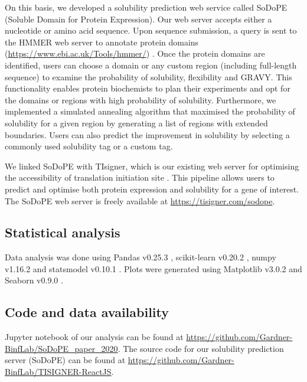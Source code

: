 On this basis, we developed a solubility prediction web service called SoDoPE (Soluble Domain for Protein Expression). Our web server accepts either a nucleotide or amino acid sequence. Upon sequence submission, a query is sent to the HMMER web server to annotate protein domains (\href{https://www.ebi.ac.uk/Tools/hmmer/}{https://www.ebi.ac.uk/Tools/hmmer/}) \citep{Potter2018-ox}. Once the protein domains are identified, users can choose a domain or any custom region (including full-length sequence) to examine the probability of solubility, flexibility and GRAVY. This functionality enables protein biochemists to plan their experiments and opt for the domains or regions with high probability of solubility. Furthermore, we implemented a simulated annealing algorithm that maximised the probability of solubility for a given region by generating a list of regions with extended boundaries. Users can also predict the improvement in solubility by selecting a commonly used solubility tag or a custom tag.

We linked SoDoPE with TIsigner, which is our existing web server for optimising the accessibility of translation initiation site \citep{bhandari2019highly}. This pipeline allows users to predict and optimise both protein expression and solubility for a gene of interest. The SoDoPE web server is freely available at \href{https://tisigner.com/sodope}{https://tisigner.com/sodope}.

\subsection{Statistical analysis}
Data analysis was done using Pandas v0.25.3 \citep{McKinney2010-rg}, scikit-learn v0.20.2 \citep{Pedregosa2011-cd}, numpy v1.16.2 \citep{Van_der_Walt2011-hv} and statsmodel v0.10.1 \citep{Seabold2010-qk}. Plots were generated using Matplotlib v3.0.2 \citep{Caswell2018-pc} and Seaborn v0.9.0 \citep{Waskom2014-ar}. 


\subsection{Code and data availability}
Jupyter notebook of our analysis can be found at \href{https://github.com/Gardner-BinfLab/SoDoPE\_paper\_2020}{https://github.com/Gardner-BinfLab/SoDoPE\_paper\_2020}. The source code for our solubility prediction server (SoDoPE) can be found at \href{https://github.com/Gardner-BinfLab/TISIGNER-ReactJS}{https://github.com/Gardner-BinfLab/TISIGNER-ReactJS}.

